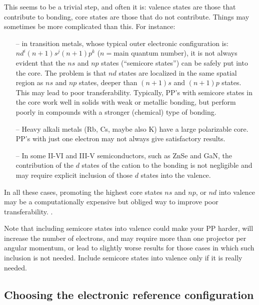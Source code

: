 This seems to be a trivial step, and often it is: valence states 
are those that contribute to bonding, core states are those that 
do not contribute. Things may sometimes be more complicated than 
this. For instance:
\begin{enumerate}
\item[--] in transition metals, whose typical outer electronic
configuration is: \\
$nd^i(n+1)s^j(n+1)p^k$ ($n=$main quantum number), it is not
always evident that the $ns$ and $np$ states (``semicore states'')
can be safely put into the core. The problem is that $nd$ states 
are localized in the same spatial region as $ns$ and $np$ states, 
deeper than $(n+1)s$ and $(n+1)p$ states. This may lead to poor 
transferability. Typically, PP's with semicore states in the core 
work well in solids with weak or metallic bonding, but perform poorly 
in compounds with a stronger (chemical) type of bonding.
\item[--] Heavy alkali metals (Rb, Cs, maybe also K) have a large
polarizable core. PP's with just one electron may not always give
satisfactory results.
\item[--] In some II-VI and III-V semiconductors, such as ZnSe and
GaN, the contribution of the $d$ states of the cation to the bonding 
is not negligible and may require explicit inclusion of those $d$ 
states into the valence.
\end{enumerate}
In all these cases, promoting the highest core states $ns$ and $np$,
or $nd$ into valence may be a computationally
expensive but obliged way to improve poor transferability. . 

Note that including semicore states into valence could make your
PP harder, will increase the number of electrons, and may require
more than one projector per angular momentum, or lead to slightly
worse results for those cases in which such inclusion is not needed. 
Include semicore states into valence only if it is really needed.

\subsection{Choosing the electronic reference configuration}

